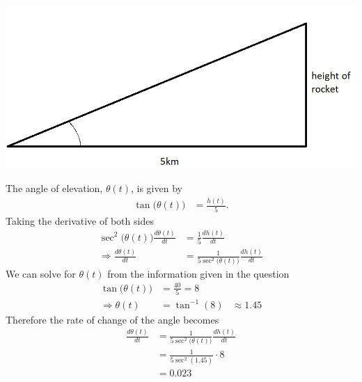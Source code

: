 \documentclass[12pt]{article}
\theoremstyle{remark}
\begin{document}
\begin{enumerate}
\begin{mdframed}[style=TheoremFrame]
\begin{center}
\includegraphics[scale=0.5]{Rocketangle}
\end{center}
The angle of elevation, $\theta(t)$, is given by
\begin{align*}
\tan\big(\theta(t)\big) &= \frac{h(t)}{5}.
\end{align*} 
Taking the derivative of both sides
\begin{align*}
\sec^2\big(\theta(t)\big) \frac{d\theta(t)}{dt}&= \frac{1}{5} \frac{dh(t)}{dt}\\
\Rightarrow \frac{d\theta(t)}{dt} &= \frac{1}{5\sec^2\big(\theta(t)\big)} \frac{dh(t)}{dt}
\end{align*}
We can solve for $\theta(t)$ from the information given in the question
\begin{align*}
\tan\big(\theta(t)\big) &= \frac{40}{5} = 8\\
\Rightarrow \theta(t) &= \tan^{-1}(8)
&\approx 1.45
\end{align*}
Therefore the rate of change of the angle becomes
\begin{align*}
\frac{d\theta(t)}{dt} &= \frac{1}{5\sec^2\big(\theta(t)\big)} \frac{dh(t)}{dt}\\
&= \frac{1}{5 \sec^2(1.45)} \cdot 8\\
&= 0.023
\end{align*}
\end{mdframed}
\end{enumerate}
\end{document}
